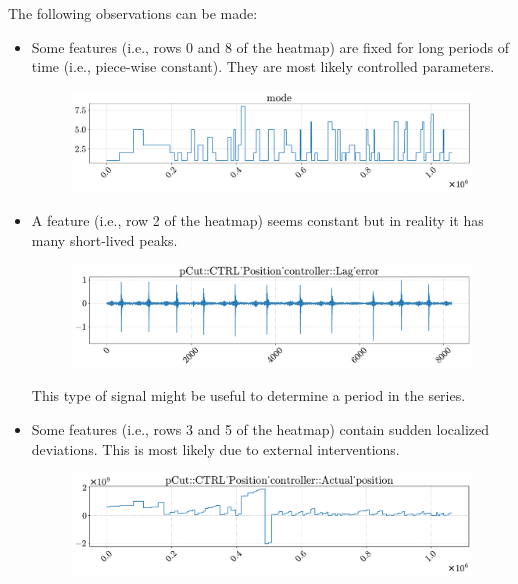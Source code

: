 The following observations can be made:
\begin{itemize}
    \item Some features (i.e., rows 0 and 8 of the heatmap) are fixed for long periods of time (i.e., piece-wise constant). They are most likely controlled parameters.
    \begin{figure}[H]
        \centering
        \includegraphics[width=0.8\linewidth]{./img/_skinwrapper_constant.pdf}
    \end{figure}

    \item A feature (i.e., row 2 of the heatmap) seems constant but in reality it has many short-lived peaks.
    \begin{figure}[H]
        \centering
        \includegraphics[width=0.8\linewidth]{./img/_skinwrapper_peaks.pdf}
    \end{figure}

    \begin{remark}
        This type of signal might be useful to determine a period in the series.
    \end{remark}

    \item Some features (i.e., rows 3 and 5 of the heatmap) contain sudden localized deviations. This is most likely due to external interventions.
    \begin{figure}[H]
        \centering
        \includegraphics[width=0.8\linewidth]{./img/_skinwrapper_deviation.pdf}
    \end{figure}
\end{itemize}


